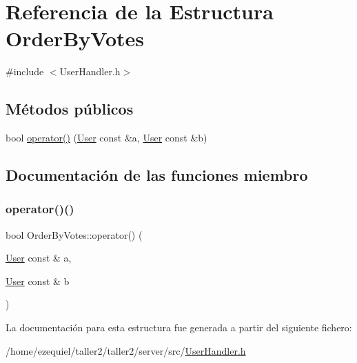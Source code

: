 \hypertarget{structOrderByVotes}{}\section{Referencia de la Estructura Order\+By\+Votes}
\label{structOrderByVotes}


{\ttfamily \#include $<$User\+Handler.\+h$>$}

\subsection*{Métodos públicos}
\begin{DoxyCompactItemize}
\item 
bool \hyperlink{structOrderByVotes_af43d1fded49999b848b8b1040fa56533}{operator()} (\hyperlink{classUser}{User} const \&a, \hyperlink{classUser}{User} const \&b)
\end{DoxyCompactItemize}


\subsection{Documentación de las funciones miembro}
\mbox{\label{structOrderByVotes_af43d1fded49999b848b8b1040fa56533}} 
\subsubsection{\texorpdfstring{operator()()}{operator()()}}
{\footnotesize\ttfamily bool Order\+By\+Votes\+::operator() (\begin{DoxyParamCaption}\item[{\hyperlink{classUser}{User} const \&}]{a,  }\item[{\hyperlink{classUser}{User} const \&}]{b }\end{DoxyParamCaption})\hspace{0.3cm}{\ttfamily [inline]}}



La documentación para esta estructura fue generada a partir del siguiente fichero\+:\begin{DoxyCompactItemize}
\item 
/home/ezequiel/taller2/taller2/server/src/\hyperlink{UserHandler_8h}{User\+Handler.\+h}\end{DoxyCompactItemize}

